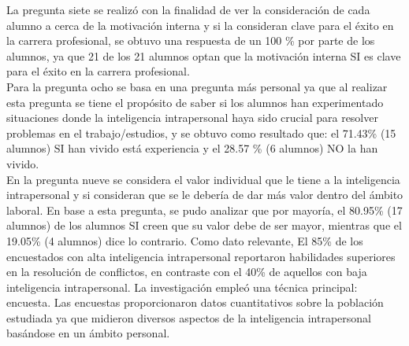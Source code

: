 La pregunta siete se realizó con la finalidad de ver la consideración de cada alumno a cerca de la
motivación interna y si la consideran clave para el éxito en la carrera profesional, se obtuvo una
respuesta de un 100 \% por parte de los alumnos, ya que 21 de los 21 alumnos optan que la motivación
interna SI es clave para el éxito en la carrera profesional.\\
Para la pregunta ocho se basa en una pregunta más personal ya que al realizar esta pregunta se tiene
el propósito de saber si los alumnos han experimentado situaciones donde la inteligencia
intrapersonal haya sido crucial para resolver problemas en el trabajo/estudios, y se obtuvo como
resultado que: el 71.43\% (15 alumnos) SI han vivido está experiencia y el 28.57 \% (6 alumnos) NO la
han vivido.\\
En la pregunta nueve se considera el valor individual que le tiene a la inteligencia intrapersonal y si
consideran que se le debería de dar más valor dentro del ámbito laboral. En base a esta pregunta, se
pudo analizar que por mayoría, el 80.95\% (17 alumnos) de los alumnos SI creen que su valor debe
de ser mayor, mientras que el 19.05\% (4 alumnos) dice lo contrario. Como dato relevante,
El 85\% de los encuestados con alta inteligencia intrapersonal reportaron
habilidades superiores en la resolución de conflictos, en contraste con el 40\% de aquellos con baja
inteligencia intrapersonal.
La investigación empleó una técnica principal: encuesta. Las encuestas proporcionaron datos
cuantitativos sobre la población estudiada ya que midieron diversos aspectos de la inteligencia
intrapersonal basándose en un ámbito personal.
